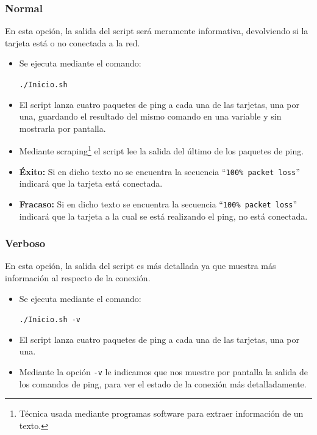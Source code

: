 \subsubsection{Normal}
En esta opción, la salida del script será meramente informativa, devolviendo si la tarjeta está o no conectada a la red.
\begin{itemize}
	\item Se ejecuta mediante el comando:
	\begin{center}
		\texttt{./Inicio.sh}
	\end{center}
	\item El script lanza cuatro paquetes de ping a cada una de las tarjetas, una por una, guardando el resultado del mismo comando en una variable y sin mostrarla por pantalla.
	\item Mediante scraping\footnote{Técnica usada mediante programas software para extraer información de un texto.} el script lee la salida del último de los paquetes de ping.
	\item \textbf{Éxito:} Si en dicho texto no se encuentra la secuencia ``\texttt{100\% packet loss}'' indicará que la tarjeta está conectada.
	\item \textbf{Fracaso:} Si en dicho texto se encuentra la secuencia ``\texttt{100\% packet loss}'' indicará que la tarjeta a la cual se está realizando el ping, no está conectada.
\end{itemize}

\subsubsection{Verboso}
En esta opción, la salida del script es más detallada ya que muestra más información al respecto de la conexión.

\begin{itemize}
	\item Se ejecuta mediante el comando:
	\begin{center}
		\texttt{./Inicio.sh -v}
	\end{center}
	\item El script lanza cuatro paquetes de ping a cada una de las tarjetas, una por una.
	\item Mediante la opción \texttt{-v} le indicamos que nos muestre por pantalla la salida de los comandos de ping, para ver el estado de la conexión más detalladamente.
\end{itemize}

